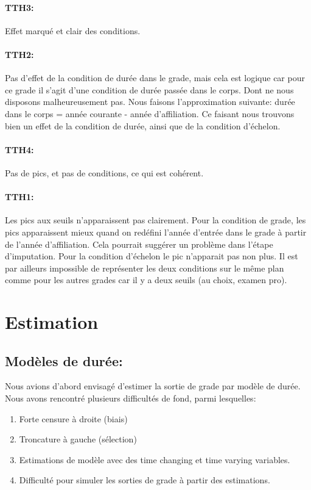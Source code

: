 \documentclass[11pt,a4paper]{article}
\begin{document}
\paragraph{TTH3:} Effet marqué et clair des conditions.

\paragraph{TTH2:} Pas d'effet de la condition de durée dans le grade, mais cela est logique car pour ce grade il s'agit d'une condition de durée passée dans le corps. Dont ne nous disposons malheureusement pas. Nous faisons l'approximation suivante: durée dans le corps = année courante - année d'affiliation. Ce faisant nous trouvons bien un effet de la condition de durée, ainsi que de la condition d'échelon. 

\paragraph{TTH4:} Pas de pics, et pas de conditions, ce qui est cohérent. 
 
\paragraph{TTH1:} Les pics aux seuils n'apparaissent pas clairement. Pour la condition de grade, les pics apparaissent mieux quand on redéfini l'année d'entrée dans le grade à partir de l'année d'affiliation. Cela pourrait suggérer un problème dans l'étape d'imputation. 
Pour la condition d'échelon le pic n'apparait pas non plus. Il est par ailleurs impossible de représenter les deux conditions sur le même plan comme pour les autres grades car il y a deux seuils (au choix, examen pro). 


\section{Estimation}

\subsection*{Modèles de durée:} 

Nous avions d'abord envisagé d'estimer la sortie de grade par modèle de durée. Nous avons rencontré plusieurs difficultés de fond, parmi lesquelles: 

\begin{enumerate}
\item Forte censure à droite (biais)
\item Troncature à gauche (sélection)
\item Estimations de modèle avec des \og time changing \fg{} et \og time varying \fg{} variables. 
\item Difficulté pour simuler les sorties de grade à partir des estimations. 
\end{enumerate}
\end{document}
